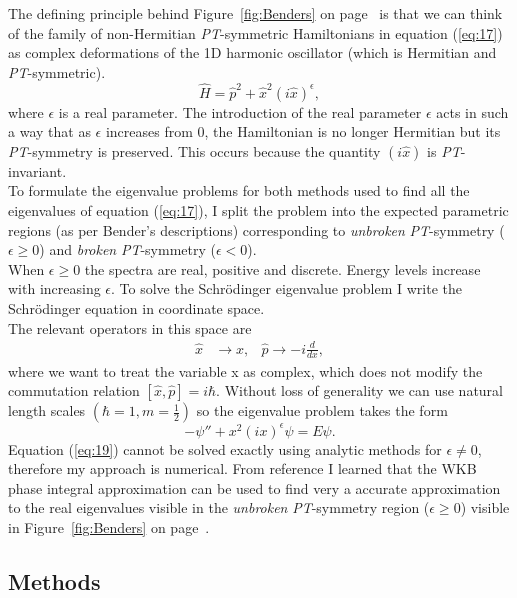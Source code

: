 \documentclass[10pt, a4paper, singlespacing, headsepline]{article}
\newcommand\PT{\textit{PT}}
\begin{document}
The defining principle behind Figure~\ref{fig:Benders} on page~\pageref{fig:Benders} is that we can think of the family of non-Hermitian \PT-symmetric Hamiltonians in equation (\ref{eq:17}) as complex deformations of the 1D harmonic oscillator (which is Hermitian and \PT-symmetric).
\begin{equation}\label{eq:17}
\hat{H} = \hat{p}^2 + \hat{x}^2 (i \hat{x})^{\epsilon},
\end{equation}
where $\epsilon$ is a real parameter. The introduction of the real parameter $\epsilon$ acts in such a way that as $\epsilon$ increases from $0$, the Hamiltonian is no longer Hermitian but its \PT-symmetry is preserved. This occurs because the quantity $(i\hat{x})$ is \PT-invariant\cite{BenderPT}\cite{Bender}.\\ 
To formulate the eigenvalue problems for both methods used to find all the eigenvalues of equation (\ref{eq:17}), I split the problem into the expected parametric regions (as per Bender's descriptions) corresponding to \textit{unbroken} \PT-symmetry ($\epsilon \geq 0$) and \textit{broken} \PT-symmetry ($\epsilon < 0$).\\
When $\epsilon \geq 0$ the spectra are real, positive and discrete. Energy levels increase with increasing $\epsilon$.
To solve the Schrödinger eigenvalue problem I write the Schrödinger equation in coordinate space.\\ The relevant operators in this space are
\begin{align} \label{eq:18}
\hat{x}& \rightarrow x,  &\hat{p}\rightarrow -i \frac{d}{dx},
\end{align}
where we want to treat the variable x as complex, which does not modify the commutation relation $[\hat{x}, \hat{p}] = i\hbar$. Without loss of generality we can use natural length scales $(\hbar = 1, m = \frac{1}{2})$ so the eigenvalue problem takes the form
\begin{equation}\label{eq:19}
-\psi'' + x^2 (i x)^{\epsilon} \psi = E \psi.
\end{equation}
Equation (\ref{eq:19}) cannot be solved exactly using analytic methods for $\epsilon \neq 0$, therefore my approach is numerical. From reference \cite{Bender} I learned that the WKB phase integral approximation can be used to find very a accurate approximation to the real eigenvalues visible in the \textit{unbroken} \PT-symmetry region ($\epsilon \geq 0$) visible in Figure~\ref{fig:Benders} on page~\pageref{fig:Benders}. 

\subsection{Methods}
\end{document}
